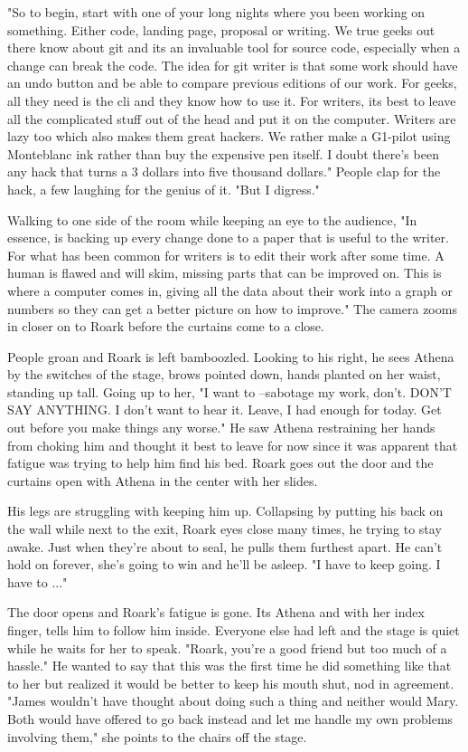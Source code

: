        "So to begin, start with one of your long nights where you been working on something. Either code, landing page, proposal or writing.
    We true geeks out there know about git and its an invaluable tool for source code, especially when a change can break the code. The idea
    for git writer is that some work should have an undo button and be able to compare previous editions of our work. For geeks, all they need
    is the cli and they know how to use it. For writers, its best to leave all the complicated stuff out of the head and put it on the computer.
    Writers are lazy too which also makes them great hackers. We rather make a G1-pilot using Monteblanc ink rather than buy the expensive pen
    itself. I doubt there's been any hack that turns a 3 dollars into five thousand dollars." People clap for the hack, a few laughing for the
    genius of it. "But I digress."

        Walking to one side of the room while keeping an eye to the audience, "In essence, is backing up every change done to a paper that is
    useful to the writer. For what has been common for writers is to edit their work after some time. A human is flawed and will skim, missing
    parts that can be improved on. This is where a computer comes in, giving all the data about their work into a graph or numbers so they can
    get a better picture on how to improve." The camera zooms in closer on to Roark before the curtains come to a close.

        People groan and Roark is left bamboozled. Looking to his right, he sees Athena by the switches of the stage, brows pointed down, hands
    planted on her waist, standing up tall. Going up to her, "I want to --sabotage my work, don't. DON'T SAY ANYTHING. I don't want to hear it.
    Leave, I had enough for today. Get out before you make things any worse." He saw Athena restraining her hands from choking him and thought
    it best to leave for now since it was apparent that fatigue was trying to help him find his bed. Roark goes out the door and the curtains
    open with Athena in the center with her slides.

        His legs are struggling with keeping him up. Collapsing by putting his back on the wall while next to the exit, Roark eyes close many
    times, he trying to stay awake. Just when they're about to seal, he pulls them furthest apart. He can't hold on forever, she's going
    to win and he'll be asleep. "I have to keep going. I have to ..."

        The door opens and Roark's fatigue is gone. Its Athena and with her index finger, tells him to follow him inside. Everyone else had left
    and the stage is quiet while he waits for her to speak. "Roark, you're a good friend but too much of a hassle." He wanted to say that this
    was the first time he did something like that to her but realized it would be better to keep his mouth shut, nod in agreement. "James
    wouldn't have thought about doing such a thing and neither would Mary. Both would have offered to go back instead and let me handle my
    own problems involving them," she points to the chairs off the stage.

